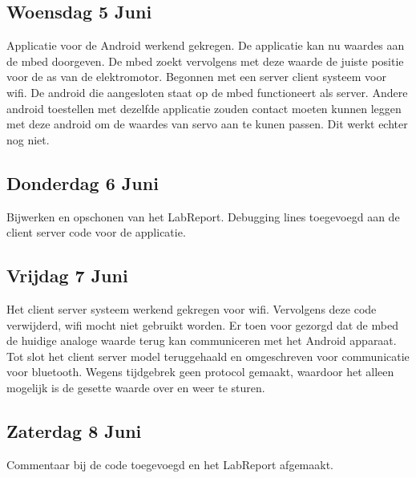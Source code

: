 \documentclass[a4paper]{article}
\begin{document}
		\subsection{Woensdag 5 Juni}
			Applicatie voor de Android werkend gekregen. De applicatie kan nu waardes aan de mbed doorgeven. De mbed zoekt vervolgens met deze waarde de juiste positie voor de as van de elektromotor. Begonnen met een server client systeem voor wifi. De android die aangesloten staat op de mbed functioneert als server. Andere android toestellen met dezelfde applicatie zouden contact moeten kunnen leggen met deze android om de waardes van servo aan te kunen passen. Dit werkt echter nog niet.
		\subsection{Donderdag 6 Juni}
			Bijwerken en opschonen van het LabReport. Debugging lines toegevoegd aan de client server code voor de applicatie.
		\subsection{Vrijdag 7 Juni}
			Het client server systeem werkend gekregen voor wifi. Vervolgens deze code verwijderd, wifi mocht niet gebruikt worden. Er toen voor gezorgd dat de mbed de huidige analoge waarde terug kan communiceren met het Android apparaat. Tot slot het client server model teruggehaald en omgeschreven voor communicatie voor bluetooth. Wegens tijdgebrek geen protocol gemaakt, waardoor het alleen mogelijk is de gesette waarde over en weer te sturen.
		\subsection{Zaterdag 8 Juni}
			Commentaar bij de code toegevoegd en het LabReport afgemaakt.
	
\end{document}
